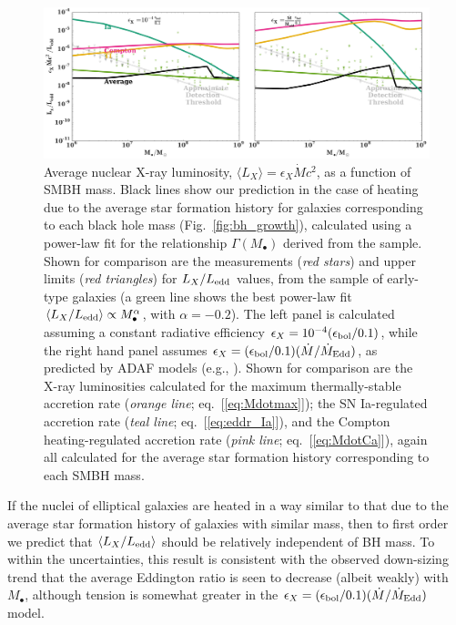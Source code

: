 \documentclass[usenatbib,fleqn]{mn2e}
\newcommand{\Mdot}{\dot{M}}
\newcommand{\MdotEdd}{\dot{M}_{\rm Edd}}
\begin{document}
\begin{figure}
\includegraphics[width=\textwidth]{miller.pdf}
\caption{\label{fig:miller} Average nuclear X-ray luminosity, $\langle
  L_X \rangle = \epsilon_X \Mdot c^2$, as a function of SMBH mass.
  Black lines show our prediction in the case of heating due to the
  average star formation history for galaxies corresponding to each
  black hole mass (Fig.~\ref{fig:bh_growth}), calculated using a
  power-law fit for the relationship $\Gamma(M_{\bullet})$ derived
  from the \citet{LauerFaber+:2007a} sample.  Shown for comparison are
  the measurements ({\it red stars}) and upper limits ({\it red
    triangles}) for $L_X/L_{\rm edd}$ values, from the
  \citet{Miller+15} sample of early-type galaxies (a green line shows
  the best power-law fit $\langle L_X/L_{\rm edd}\rangle \propto
  M_{\bullet}^{\alpha}$, with $\alpha = -0.2$).  The left panel is
  calculated assuming a constant radiative efficiency
  $\epsilon_X=10^{-4} (\epsilon_{\rm bol}/0.1)$, while the right hand
  panel assumes $\epsilon_X= (\epsilon_{\rm
    bol}/0.1)(\Mdot/\MdotEdd)$, as predicted by ADAF models (e.g.,
  \citealt{Narayan&Yi95}).  Shown for comparison are the X-ray
  luminosities calculated for the maximum thermally-stable accretion
  rate ({\it orange line}; eq.~[\ref{eq:Mdotmax}]); the SN
  Ia-regulated accretion rate ({\it teal line};
  eq.~[\ref{eq:eddr_Ia}]), and the Compton heating-regulated accretion
  rate ({\it pink line}; eq.~[\ref{eq:MdotCa}]), again all calculated
  for the average star formation history corresponding to each SMBH
  mass.}
\end{figure}

If the nuclei of elliptical galaxies are heated in a way similar to
that due to the average star formation history of galaxies with
similar mass, then to first order we predict that $\langle
L_{X}/L_{\rm edd}\rangle$ should be relatively independent of BH mass.
To within the uncertainties, this result is consistent with the
observed down-sizing trend that the average Eddington ratio is seen to
decrease (albeit weakly) with $M_{\bullet}$, although tension is
somewhat greater in the $\epsilon_X= (\epsilon_{\rm
  bol}/0.1)(\Mdot/\MdotEdd)$ model.
\end{document}
